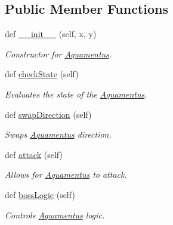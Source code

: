 \subsection*{Public Member Functions}
\begin{DoxyCompactItemize}
\item 
def \hyperlink{classactor_1_1aquamentus_1_1_aquamentus_a410081eed92439a0429ea0fb75eb2328}{\+\_\+\+\_\+init\+\_\+\+\_\+} (self, x, y)
\begin{DoxyCompactList}\small\item\em Constructor for \hyperlink{classactor_1_1aquamentus_1_1_aquamentus}{Aquamentus}. \end{DoxyCompactList}\item 
def \hyperlink{classactor_1_1aquamentus_1_1_aquamentus_a9a995cf75da6e464cf0292c7514536e5}{check\+State} (self)
\begin{DoxyCompactList}\small\item\em Evaluates the state of the \hyperlink{classactor_1_1aquamentus_1_1_aquamentus}{Aquamentus}. \end{DoxyCompactList}\item 
def \hyperlink{classactor_1_1aquamentus_1_1_aquamentus_a63dc79ec42118be2c34462ea5fdcbade}{swap\+Direction} (self)
\begin{DoxyCompactList}\small\item\em Swaps \hyperlink{classactor_1_1aquamentus_1_1_aquamentus}{Aquamentus}\textquotesingle{} direction. \end{DoxyCompactList}\item 
def \hyperlink{classactor_1_1aquamentus_1_1_aquamentus_a8cd94900aed592550a65f7761a6331bb}{attack} (self)
\begin{DoxyCompactList}\small\item\em Allows for \hyperlink{classactor_1_1aquamentus_1_1_aquamentus}{Aquamentus} to attack. \end{DoxyCompactList}\item 
def \hyperlink{classactor_1_1aquamentus_1_1_aquamentus_a5569e3e099e8754db819fe31e893bb6f}{boss\+Logic} (self)
\begin{DoxyCompactList}\small\item\em Controls \hyperlink{classactor_1_1aquamentus_1_1_aquamentus}{Aquamentus} logic. \end{DoxyCompactList}\end{DoxyCompactItemize}
